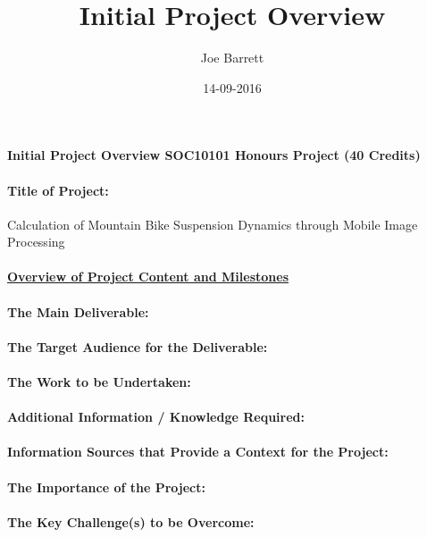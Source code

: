 \documentclass{article}
\title{Initial Project Overview}
\date{14-09-2016}
\author{Joe Barrett}
\begin{document}
	\setcounter{secnumdepth}{-1}
	\paragraph{\Large Initial Project Overview
			\newline
			SOC10101 Honours Project (40 Credits)
	}
	\paragraph{Title of Project:\newline}
	Calculation of Mountain Bike Suspension Dynamics through Mobile Image Processing
	\paragraph{\underline{Overview of Project Content and Milestones}}
	\paragraph{The Main Deliverable:}
	\paragraph{The Target Audience for the Deliverable:}
	\paragraph{The Work to be Undertaken:}
	\paragraph{Additional Information / Knowledge Required:}
	\paragraph{Information Sources that Provide a Context for the Project:}
	\paragraph{The Importance of the Project:}
	\paragraph{The Key Challenge(s) to be Overcome:}
\end{document}
